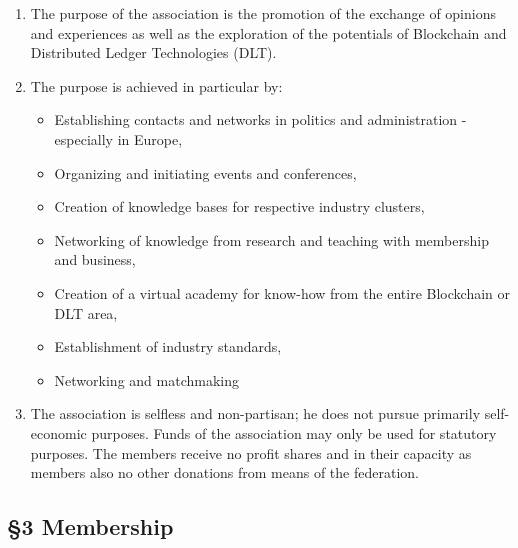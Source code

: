 \documentclass{article}
\begin{document}
\begin{enumerate}
	\item The purpose of the association is the promotion of the exchange of opinions and experiences as well as the exploration of the potentials of Blockchain and Distributed Ledger Technologies (DLT).
	\item The purpose is achieved in particular by: \\
	
	\begin{itemize}
		\item Establishing contacts and networks in politics and administration - especially in Europe,
		\item Organizing and initiating events and conferences,
		\item Creation of knowledge bases for respective industry clusters,
		\item Networking of knowledge from research and teaching with membership and business,
		\item Creation of a virtual academy for know-how from the entire Blockchain or DLT area,
		\item Establishment of industry standards,
		\item Networking and matchmaking	
	\end{itemize}
	
	\item The association is selfless and non-partisan; he does not pursue primarily self-economic purposes. Funds of the association may only be used for statutory purposes. The members receive no profit shares and in their capacity as members also no other donations from means of the federation.
\end{enumerate}

\subsection{\S 3 Membership}
\end{document}

